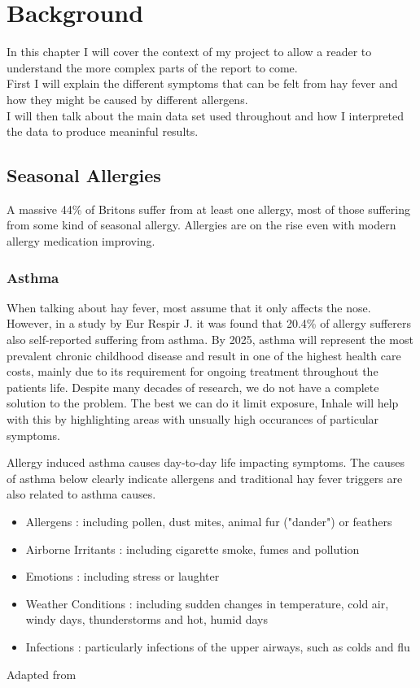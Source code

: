 \chapter{Background}
\label{cha:back}

In this chapter I will cover the context of my project to allow a reader to understand the more complex parts of the report to come.\\
First I will explain the different symptoms that can be felt from hay fever and how they might be caused by different allergens.\\
I will then talk about the main data set used throughout and how I interpreted the data to produce meaninful results.\\

\section{Seasonal Allergies}
A massive 44\% of Britons suffer from at least one allergy, most of those suffering from some kind of seasonal allergy. Allergies are on the rise even with modern allergy medication improving.
\cite{mintelallergy}

\subsection{Asthma}
When talking about hay fever, most assume that it only affects the nose. However, in a study by Eur Respir J. it was found that 20.4\% of allergy sufferers also self-reported suffering from asthma\cite{rhinitis}. By 2025, asthma will represent the most prevalent chronic childhood disease and result in one of the highest health care costs, mainly due to its requirement for ongoing treatment throughout the patients life\cite{childhood}. Despite many decades of research, we do not have a complete solution to the problem. The best we can do it limit exposure, Inhale will help with this by highlighting areas with unsually high occurances of particular symptoms.

Allergy induced asthma causes day-to-day life impacting symptoms. The causes of asthma below clearly indicate allergens and traditional hay fever triggers are also related to asthma causes.\\


\begin{itemize}
  \item Allergens : including pollen, dust mites, animal fur ("dander") or feathers
  \item Airborne Irritants : including cigarette smoke, fumes and pollution
  \item Emotions : including stress or laughter
  \item Weather Conditions : including sudden changes in temperature, cold air, windy days, thunderstorms and hot, humid days
  \item Infections : particularly infections of the upper airways, such as colds and flu
\end{itemize}Adapted from \cite{urlasthmacauses}\\

